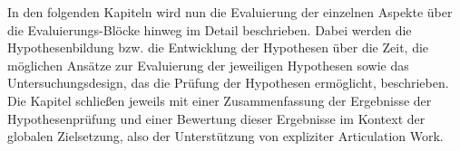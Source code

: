 In den folgenden Kapiteln wird nun die Evaluierung der einzelnen Aspekte über die Evaluierungs-Blöcke hinweg im Detail beschrieben. Dabei werden die Hypothesenbildung bzw. die Entwicklung der Hypothesen über die Zeit, die möglichen Ansätze zur Evaluierung der jeweiligen Hypothesen sowie das Untersuchungsdesign, das die Prüfung der Hypothesen ermöglicht, beschrieben. Die Kapitel schließen jeweils mit einer Zusammenfassung der Ergebnisse der Hypothesenprüfung und einer Bewertung dieser Ergebnisse im Kontext der globalen Zielsetzung, also der Unterstützung von expliziter Articulation Work.

